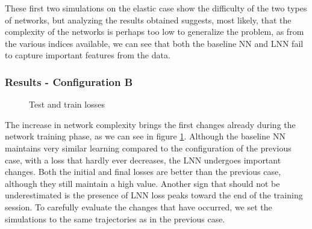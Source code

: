 \documentclass[a4paper]{article}
\begin{document}
These first two simulations on the elastic case show the difficulty of the two types of networks, but analyzing the results obtained suggests, most likely, that the complexity of the networks is perhaps too low to generalize the problem, as from the various indices available, we can see that both the baseline NN and LNN fail to capture important features from the data.\\

\subsubsection{Results - Configuration B}
\begin{figure}
    \centering
    \qquad
    \caption{Test and train losses}
    \label{fig:elastic_losses_500_4}
\end{figure}

The increase in network complexity brings the first changes already during the network training phase, as we can see in figure \ref{fig:elastic_losses_500_4}. Although the baseline NN maintains very similar learning compared to the configuration of the previous case, with a loss that hardly ever decreases, the LNN undergoes important changes. Both the initial and final losses are better than the previous case, although they still maintain a high value. Another sign that should not be underestimated is the presence of LNN loss peaks toward the end of the training session. To carefully evaluate the changes that have occurred, we set the simulations to the same trajectories as in the previous case.\\
\end{document}

